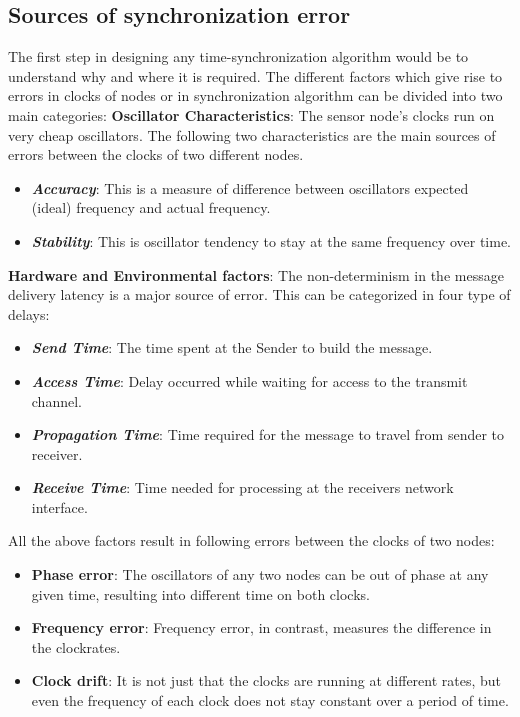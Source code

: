 \documentclass[journal]{IEEEtran}
\begin{document}
\subsection{\textbf{Sources of synchronization error}}
The first step in designing any time-synchronization algorithm would
be to understand why and where it is required. The different factors
which give rise to errors in clocks of nodes or in synchronization
algorithm can be divided into two main categories:\newline
\textbf{Oscillator Characteristics}: The sensor node's clocks run on very cheap oscillators.
      The following two characteristics are the main sources of errors between the clocks
      of two different nodes.
         \begin{itemize}
         \item \emph{\textbf{Accuracy}}: This is a measure of difference between oscillators expected (ideal)
           frequency and actual frequency. 
         \item \emph{\textbf{Stability}}: This is oscillator tendency to stay at the same frequency over
           time.
      \end{itemize}
\textbf{Hardware and Environmental factors}: The non-determinism in the message delivery latency
      is a major source of error. This can be categorized in four type of
      delays:
      \begin{itemize}
         \item \emph{\textbf{Send Time}}: The time spent at the Sender to build the message.
         \item \emph{\textbf{Access Time}}: Delay occurred while waiting for access to the transmit channel.
         \item \emph{\textbf{Propagation Time}}: Time required for the message to travel from sender to receiver.
         \item \emph{\textbf{Receive Time}}: Time needed for processing at the receivers network
         interface.
      \end{itemize}
      All the above factors result in following errors between the clocks of two nodes:
\begin{itemize}
\item \textbf{Phase error}: The oscillators of any two nodes can be out of phase at
any given time, resulting into different time on both clocks. 
\item \textbf{Frequency error}: Frequency error, in contrast, measures the difference in the clockrates.
\item \textbf{Clock drift}: It is not just that the clocks are running at different rates, but even
the frequency of each clock does not stay constant over a period of
time.
\end{itemize}
\end{document}
